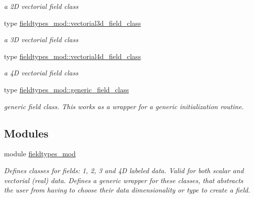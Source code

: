\begin{DoxyCompactItemize}
\begin{DoxyCompactList}\small\item\em a 2D vectorial field class \end{DoxyCompactList}\item 
type \mbox{\hyperlink{structfieldtypes__mod_1_1vectorial3d__field__class}{fieldtypes\+\_\+mod\+::vectorial3d\+\_\+field\+\_\+class}}
\begin{DoxyCompactList}\small\item\em a 3D vectorial field class \end{DoxyCompactList}\item 
type \mbox{\hyperlink{structfieldtypes__mod_1_1vectorial4d__field__class}{fieldtypes\+\_\+mod\+::vectorial4d\+\_\+field\+\_\+class}}
\begin{DoxyCompactList}\small\item\em a 4D vectorial field class \end{DoxyCompactList}\item 
type \mbox{\hyperlink{structfieldtypes__mod_1_1generic__field__class}{fieldtypes\+\_\+mod\+::generic\+\_\+field\+\_\+class}}
\begin{DoxyCompactList}\small\item\em generic field class. This works as a wrapper for a generic initialization routine. \end{DoxyCompactList}\end{DoxyCompactItemize}
\subsection*{Modules}
\begin{DoxyCompactItemize}
\item 
module \mbox{\hyperlink{namespacefieldtypes__mod}{fieldtypes\+\_\+mod}}
\begin{DoxyCompactList}\small\item\em Defines classes for \textquotesingle{}fields\textquotesingle{}\+: 1, 2, 3 and 4D labeled data. Valid for both scalar and vectorial (real) data. Defines a generic wrapper for these classes, that abstracts the user from having to choose their data dimensionality or type to create a field. \end{DoxyCompactList}\end{DoxyCompactItemize}
